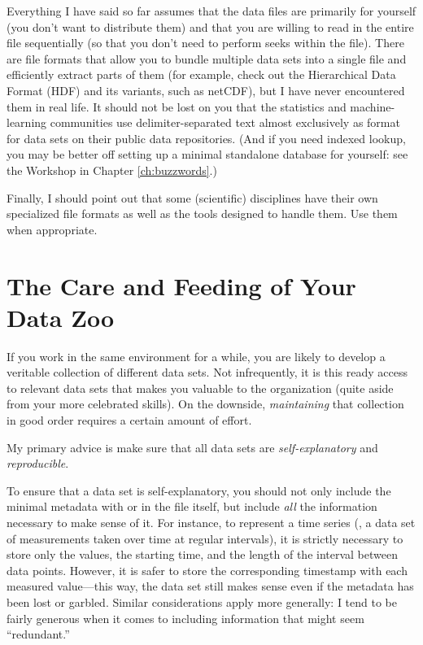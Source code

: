 Everything I have said so far assumes that the data files are
primarily for yourself (you don't want to distribute them) and that
you are willing to read in the entire file sequentially (so that you
don't need to perform seeks within the file). There are file formats
that allow you to bundle multiple data sets into a single file and
efficiently extract parts of them (for example, check out the
Hierarchical Data Format (HDF) and its variants, such as netCDF), but
I have never encountered them in real life. It should not be lost on
you that the statistics and machine-learning communities use
delimiter-separated text almost exclusively as format for data sets on
their public data repositories. (And if you need indexed lookup, you
may be better off setting up a minimal standalone database for
yourself: see the Workshop in Chapter \ref{ch:buzzwords}.)

Finally, I should point out that some (scientific) disciplines have
their own specialized file formats as well as the tools designed to
handle them. Use them when appropriate.

\section{The Care and Feeding of Your Data Zoo}


If you work in the same environment for a while, you are likely to
develop a veritable collection of different data sets.  Not
infrequently, it is this ready access to relevant data sets that makes
you valuable to the organization (quite aside from your more
celebrated skills). On the downside, \emph{maintaining} that
collection in good order requires a certain amount of effort.

My primary advice is make sure that all data sets are
\emph{self-explanatory} and \emph{reproducible}. 

To ensure that a data set is self-explanatory, you should not only
include the minimal metadata with or in the file itself, but include
\emph{all} the information necessary to make sense of it. For
instance, to represent a time series (\ie, a data set of measurements
taken over time at regular intervals), it is strictly necessary to
store only the values, the starting time, and the length of the
interval between data points.  However, it is safer to store the
corresponding timestamp with each measured value---this way, the data
set still makes sense even if the metadata has been lost or garbled.
Similar considerations apply more generally: I tend to be fairly
generous when it comes to including information that might seem
``redundant.''

